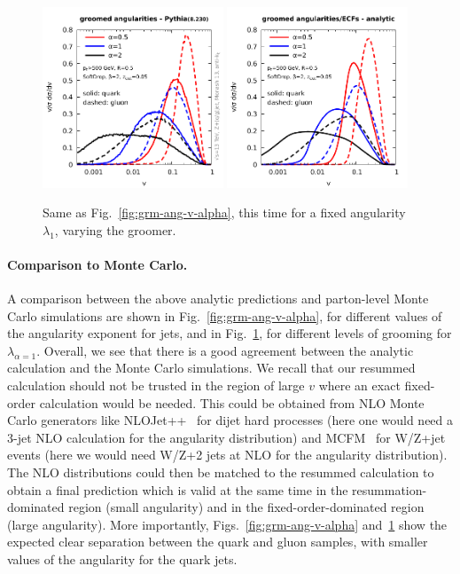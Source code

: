 \begin{figure}
  \includegraphics[width=0.48\textwidth,page=2]{figures/groomed-angularities-pythia.pdf}%
  \hfill%
  \includegraphics[width=0.48\textwidth,page=2]{figures/groomed-angularities-analytic.pdf}%
  \caption{Same as Fig.~\ref{fig:grm-ang-v-alpha}, this time for a
    fixed angularity $\lambda_1$, varying the
    groomer.}\label{fig:grm-ang-v-beta}
\end{figure}  

\paragraph{Comparison to Monte Carlo.}
%
A comparison between the above
analytic predictions and parton-level Monte Carlo simulations are
shown in Fig.~\ref{fig:grm-ang-v-alpha}, for different values of the angularity
exponent for \SD jets, and in Fig.~\ref{fig:grm-ang-v-beta}, for different
levels of grooming for $\lambda_{\alpha=1}$.
%
Overall, we see that there is a good agreement between the analytic
calculation and the Monte Carlo simulations.
%
We recall that our resummed calculation should not be trusted in the
region of large $v$ where an exact fixed-order calculation would be
needed. This could be obtained from NLO Monte Carlo generators like
NLOJet++~\cite{Nagy:2003tz} for dijet hard processes (here one would
need a 3-jet NLO calculation for the angularity distribution) and
MCFM~\cite{Campbell:1999ah,Campbell:2011bn,Campbell:2015qma} for
W/Z+jet events (here we would need W/Z+2 jets at NLO for the
angularity distribution).
%
The NLO distributions could then be matched to the resummed calculation
to obtain a final prediction which is valid at the same time in the
resummation-dominated region (small angularity) and in the
fixed-order-dominated region (large angularity).
%
More importantly, Figs.~\ref{fig:grm-ang-v-alpha}
and~\ref{fig:grm-ang-v-beta} show the expected clear separation
between the quark and gluon samples, with smaller values of the
angularity for the quark jets.


